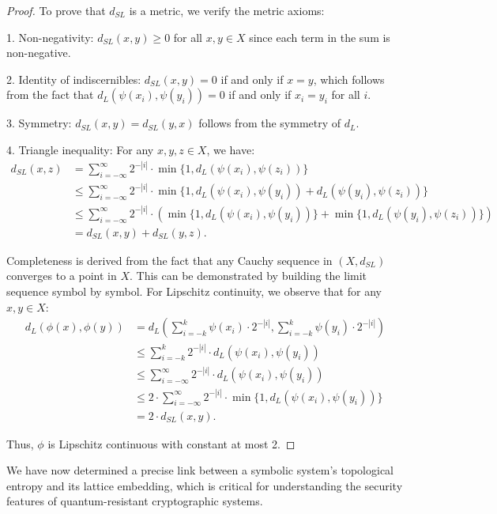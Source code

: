 \documentclass[12pt,a4paper]{article}
\begin{document}
\begin{proof}
To prove that $d_{SL}$ is a metric, we verify the metric axioms:

1. Non-negativity: $d_{SL}(x, y) \geq 0$ for all $x, y \in X$ since each term in the sum is non-negative.

2. Identity of indiscernibles: $d_{SL}(x, y) = 0$ if and only if $x = y$, which follows from the fact that $d_L(\psi(x_i), \psi(y_i)) = 0$ if and only if $x_i = y_i$ for all $i$.

3. Symmetry: $d_{SL}(x, y) = d_{SL}(y, x)$ follows from the symmetry of $d_L$.

4. Triangle inequality: For any $x, y, z \in X$, we have:
\begin{align*}
d_{SL}(x, z) &= \sum_{i=-\infty}^{\infty} 2^{-|i|} \cdot \min\{1, d_L(\psi(x_i), \psi(z_i))\} \\
&\leq \sum_{i=-\infty}^{\infty} 2^{-|i|} \cdot \min\{1, d_L(\psi(x_i), \psi(y_i)) + d_L(\psi(y_i), \psi(z_i))\} \\
&\leq \sum_{i=-\infty}^{\infty} 2^{-|i|} \cdot (\min\{1, d_L(\psi(x_i), \psi(y_i))\} + \min\{1, d_L(\psi(y_i), \psi(z_i))\}) \\
&= d_{SL}(x, y) + d_{SL}(y, z).
\end{align*}

Completeness is derived from the fact that any Cauchy sequence in $(X, d_{SL})$ converges to a point in $X$. This can be demonstrated by building the limit sequence symbol by symbol. For Lipschitz continuity, we observe that for any $x, y \in X$:
\begin{align*}
d_L(\phi(x), \phi(y)) &= d_L\left(\sum_{i=-k}^{k} \psi(x_i) \cdot 2^{-|i|}, \sum_{i=-k}^{k} \psi(y_i) \cdot 2^{-|i|}\right) \\
&\leq \sum_{i=-k}^{k} 2^{-|i|} \cdot d_L(\psi(x_i), \psi(y_i)) \\
&\leq \sum_{i=-\infty}^{\infty} 2^{-|i|} \cdot d_L(\psi(x_i), \psi(y_i)) \\
&\leq 2 \cdot \sum_{i=-\infty}^{\infty} 2^{-|i|} \cdot \min\{1, d_L(\psi(x_i), \psi(y_i))\} \\
&= 2 \cdot d_{SL}(x, y).
\end{align*}

Thus, $\phi$ is Lipschitz continuous with constant at most 2.
\end{proof}
We have now determined a precise link between a symbolic system's topological entropy and its lattice embedding, which is critical for understanding the security features of quantum-resistant cryptographic systems.
\end{document}
